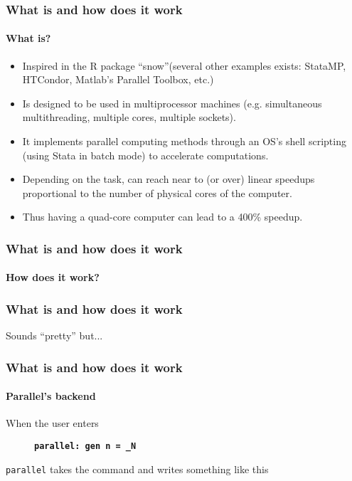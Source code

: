 \documentclass[9pt,\ExtraDocOpts]{beamer}
\begin{document}
\begin{frame} %
\frametitle{What is and how does it work}
\framesubtitle{What is?}

\begin{itemize}
\item Inspired in the R package ``snow''\pause (several other examples exists: StataMP, HTCondor, Matlab's Parallel Toolbox, etc.)\pause
\item Is designed to be used in multiprocessor machines (e.g. simultaneous multithreading, multiple cores, multiple sockets).\pause
\item It implements parallel computing methods through an OS's shell scripting (using Stata in batch mode) to accelerate computations.\pause
\item Depending on the task, can reach near to (or over) linear speedups proportional to the number of physical cores of the computer.\pause
\item Thus having a quad-core computer can lead to a 400\% speedup.
\end{itemize}

\end{frame}

\begin{frame}[b]
\frametitle{What is and how does it work}
\framesubtitle{How does it work?}
\begin{figure}
\centering
\scalebox{.65}{}
\end{figure}
\end{frame}

\begin{frame}
\frametitle{What is and how does it work}
{\Large Sounds ``pretty'' but...}
\end{frame}

\begin{frame}
\frametitle{What is and how does it work}
\framesubtitle{Parallel's backend}

When the user enters 

\begin{figure}[fragile]
\small
\centering
{\bf{\tt parallel: gen n = \_N}}
\end{figure} 

{\tt parallel} takes the command and writes something like this\pause
\bigskip
\scriptsize


\end{frame}
\end{document}
